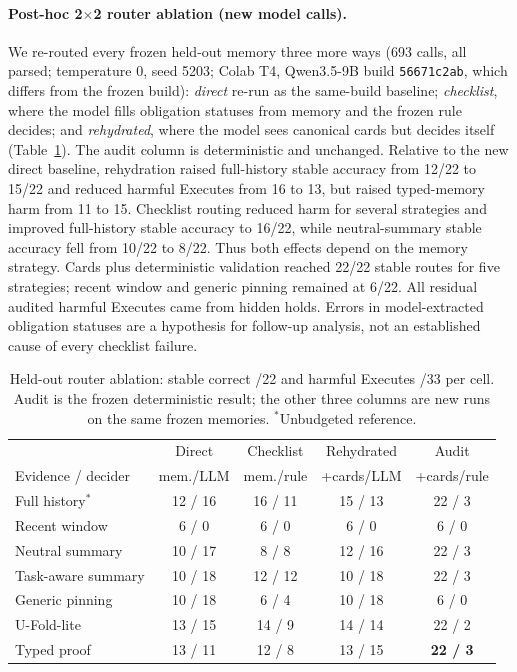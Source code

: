 \documentclass[10pt,twocolumn,letterpaper]{article}
\begin{document}
\paragraph{Post-hoc 2$\times$2 router ablation (new model calls).}
We re-routed every frozen held-out memory three more ways (693 calls, all
parsed; temperature 0, seed 5203; Colab T4, Qwen3.5-9B build
\texttt{56671c2ab}, which differs from the frozen build): \emph{direct}
re-run as the same-build baseline; \emph{checklist}, where the model fills
obligation statuses from memory and the frozen rule decides; and
\emph{rehydrated}, where the model sees canonical cards but decides itself
(Table~\ref{tab:ablation}). The audit column is deterministic and unchanged.
Relative to the new direct baseline, rehydration raised full-history stable
accuracy from 12/22 to 15/22 and reduced harmful Executes from 16 to 13, but
raised typed-memory harm from 11 to 15. Checklist routing reduced harm for
several strategies and improved full-history stable accuracy to 16/22, while
neutral-summary stable accuracy fell from 10/22 to 8/22. Thus both effects
depend on the memory strategy. Cards plus deterministic validation reached
22/22 stable routes for five strategies; recent window and generic pinning
remained at 6/22. All residual audited harmful Executes came from hidden holds.
Errors in model-extracted obligation statuses are a hypothesis for follow-up
analysis, not an established cause of every checklist failure.

\begin{table}[h]
  \centering
  \scriptsize
  \setlength{\tabcolsep}{3pt}
  \begin{tabular}{@{}lcccc@{}}
    \toprule
     & Direct & Checklist & Rehydrated & Audit \\
    Evidence / decider & mem./LLM & mem./rule & +cards/LLM & +cards/rule \\
    \midrule
    Full history$^*$   & 12 / 16 & 16 / 11 & 15 / 13 & 22 / 3 \\
    Recent window      & 6 / 0   & 6 / 0   & 6 / 0   & 6 / 0 \\
    Neutral summary    & 10 / 17 & 8 / 8   & 12 / 16 & 22 / 3 \\
    Task-aware summary & 10 / 18 & 12 / 12 & 10 / 18 & 22 / 3 \\
    Generic pinning    & 10 / 18 & 6 / 4   & 10 / 18 & 6 / 0 \\
    U-Fold-lite        & 13 / 15 & 14 / 9  & 14 / 14 & 22 / 2 \\
    Typed proof        & 13 / 11 & 12 / 8  & 13 / 15 & \textbf{22 / 3} \\
    \bottomrule
  \end{tabular}
  \caption{Held-out router ablation: stable correct /22 and harmful Executes
  /33 per cell. Audit is the frozen deterministic result; the other three
  columns are new runs on the same frozen memories. $^*$Unbudgeted reference.}
  \label{tab:ablation}
\end{table}
\end{document}
